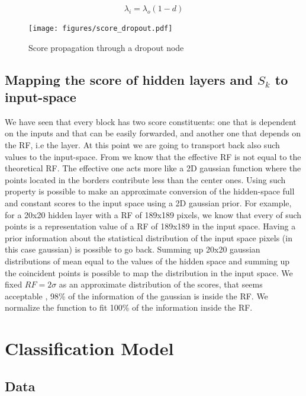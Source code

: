 \documentclass[preprint]{elsarticle}
\theoremstyle{definition} %
\theoremstyle{remark}
\begin{document}
\begin{equation}
 \lambda_i = \lambda_o (1-d)
\end{equation}

\begin{figure}[h!]
	\centering
	\texttt{[image: figures/score\_dropout.pdf]}
	\caption{Score propagation through a dropout node}
	\label{fig:score_dropout}
\end{figure}

\subsection{Mapping the score of hidden layers and $S_k$ to input-space}\label{sec:mapping-input}

We have seen that every block has two score constituents: one that is dependent on the inputs and that can be easily forwarded, and another one that depends on the RF, i.e the layer. At this point we are going to transport back also such values to the input-space. From \citep{luo2016understanding} we know that the effective RF is not equal to the theoretical RF. The effective one acts more like a 2D gaussian function where the points located in the borders contribute less than the center ones. Using such property is possible to make an approximate conversion of the hidden-space full and constant scores to the input space using a 2D gaussian prior. For example, for a 20x20 hidden layer with a RF of 189x189 pixels, we know that every of such points is a representation value of a RF of 189x189 in the input space. Having a prior information about the statistical distribution of the input space pixels (in this case gaussian) is possible to go back. Summing up 20x20 gaussian distributions of mean equal to the values of the hidden space and summing up the coincident points is possible to map the distribution in the input space. We fixed $RF = 2\sigma$ as an approximate distribution of the scores, that seems acceptable \citep{luo2016understanding},  98\% of the information of the gaussian is inside the RF. We normalize the function to fit 100\% of the information inside the RF.

\section{Classification Model}\label{sec:class}

\subsection{Data}
\end{document}
